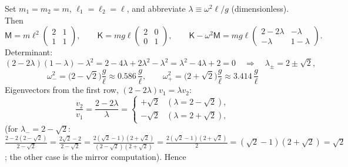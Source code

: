 \documentclass[11pt]{article}
\theoremstyle{plain}
\theoremstyle{definition}
\theoremstyle{remark}
\newcommand{\mM}{\mathsf{M}}
\newcommand{\mK}{\mathsf{K}}
\begin{document}
Set $m_1 = m_2 = m$, $\ell_1 = \ell_2 = \ell$, and abbreviate
$\lambda \equiv \omega^2\ell/g$ (dimensionless). Then
\begin{equation}
  \mM = m\ell^2\begin{pmatrix} 2 & 1\\ 1 & 1\end{pmatrix},
  \qquad
  \mK = mg\ell\begin{pmatrix} 2 & 0\\ 0 & 1\end{pmatrix},
  \qquad
  \mK - \omega^2\mM
  = mg\ell\begin{pmatrix}
    2 - 2\lambda & -\lambda\\
    -\lambda & 1 - \lambda
  \end{pmatrix}.
\end{equation}
Determinant:
\begin{equation}
  (2 - 2\lambda)(1-\lambda) - \lambda^2
  = 2 - 4\lambda + 2\lambda^2 - \lambda^2
  = \lambda^2 - 4\lambda + 2 = 0
  \quad\Longrightarrow\quad
  \lambda_\pm = 2 \pm \sqrt2 ,
\end{equation}
\begin{equation}
  \boxed{\;
  \omega_-^2 = \bigl(2 - \sqrt2\bigr)\frac{g}{\ell} \approx 0.586\,\frac{g}{\ell},
  \qquad
  \omega_+^2 = \bigl(2 + \sqrt2\bigr)\frac{g}{\ell} \approx 3.414\,\frac{g}{\ell}
  \;}
\end{equation}
Eigenvectors from the first row, $(2-2\lambda)v_1 = \lambda v_2$:
\begin{equation}
  \frac{v_2}{v_1} = \frac{2 - 2\lambda}{\lambda}
  = \begin{cases}
      +\sqrt2 & (\lambda = 2 - \sqrt2), \\[2pt]
      -\sqrt2 & (\lambda = 2 + \sqrt2),
    \end{cases}
\end{equation}
(for $\lambda_- = 2-\sqrt2$:
$\tfrac{2 - 2(2-\sqrt2)}{2-\sqrt2} = \tfrac{2\sqrt2 - 2}{2 - \sqrt2}
= \tfrac{2(\sqrt2-1)(2+\sqrt2)}{(2-\sqrt2)(2+\sqrt2)}
= \tfrac{2(\sqrt2-1)(2+\sqrt2)}{2} = (\sqrt2-1)(2+\sqrt2) = \sqrt2$;
the other case is the mirror computation). Hence
\end{document}
